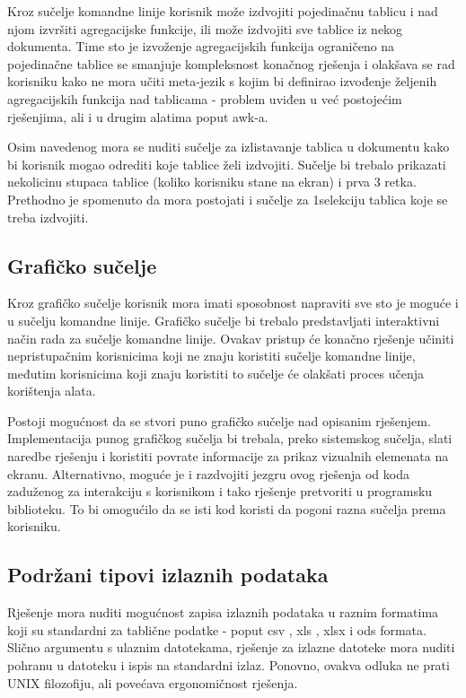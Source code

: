 \documentclass[times, utf8, zavrsni]{fer}
\begin{document}
Kroz sučelje komandne linije korisnik može izdvojiti pojedinačnu tablicu i nad
njom izvršiti agregacijske funkcije, ili može izdvojiti sve tablice iz nekog
dokumenta. Time sto je izvoženje agregacijskih funkcija ograničeno na
pojedinačne tablice se smanjuje kompleksnost konačnog rješenja i olakšava se
rad korisniku kako ne mora učiti meta-jezik s kojim bi definirao izvođenje
željenih agregacijskih funkcija nad tablicama - problem uviđen u već postojećim
rješenjima, ali i u drugim alatima poput awk-a.

Osim navedenog mora se nuditi sučelje za izlistavanje tablica u dokumentu
kako bi korisnik mogao odrediti koje tablice želi izdvojiti. Sučelje bi
trebalo prikazati nekolicinu stupaca tablice (koliko korisniku stane na ekran)
i prva 3 retka.  Prethodno je spomenuto da mora postojati i sučelje za
1selekciju tablica koje se treba izdvojiti.

\subsection{Grafičko sučelje}

Kroz grafičko sučelje korisnik mora imati sposobnost napraviti sve sto je
moguće i u sučelju komandne linije. Grafičko sučelje bi trebalo predstavljati
interaktivni način rada za sučelje komandne linije. Ovakav pristup će konačno
rješenje učiniti nepristupačnim korisnicima koji ne znaju koristiti sučelje
komandne linije, međutim korisnicima koji znaju koristiti to sučelje će
olakšati proces učenja korištenja alata.

Postoji mogućnost da se stvori puno grafičko sučelje nad opisanim rješenjem.
Implementacija punog grafičkog sučelja bi trebala, preko sistemskog sučelja,
slati naredbe rješenju i koristiti povrate informacije za prikaz vizualnih
elemenata na ekranu. Alternativno, moguće je i razdvojiti jezgru ovog rješenja
od koda zaduženog za interakciju s korisnikom i tako rješenje pretvoriti u
programsku biblioteku. To bi omogućilo da se isti kod koristi da pogoni razna
sučelja prema korisniku.

\subsection{Podržani tipovi izlaznih podataka}

Rješenje mora nuditi mogućnost zapisa izlaznih podataka u raznim formatima
koji su standardni za tablične podatke - poput csv \cite{csv_documentation},
xls \cite{xls_documentation}, xlsx \cite{xlsx_documentation} i
ods \cite{ods_documentation} formata.
Slično argumentu s ulaznim datotekama, rješenje za izlazne datoteke mora nuditi
pohranu u datoteku i ispis na standardni izlaz. Ponovno, ovakva odluka ne
prati UNIX filozofiju, ali povećava ergonomičnost rješenja.
\end{document}
